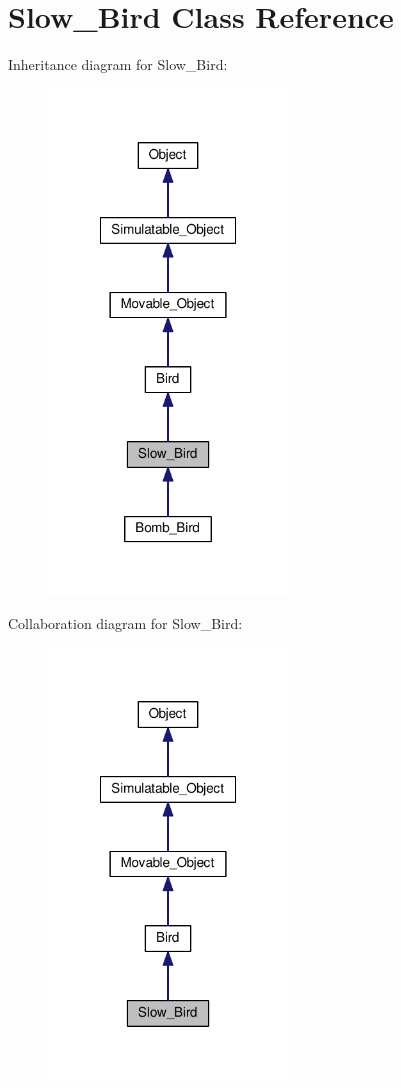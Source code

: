 \hypertarget{classSlow__Bird}{\section{Slow\+\_\+\+Bird Class Reference}
\label{classSlow__Bird}
}


Inheritance diagram for Slow\+\_\+\+Bird\+:\nopagebreak
\begin{figure}[H]
\begin{center}
\leavevmode
\includegraphics[width=180pt]{classSlow__Bird__inherit__graph}
\end{center}
\end{figure}


Collaboration diagram for Slow\+\_\+\+Bird\+:\nopagebreak
\begin{figure}[H]
\begin{center}
\leavevmode
\includegraphics[width=180pt]{classSlow__Bird__coll__graph}
\end{center}
\end{figure}
